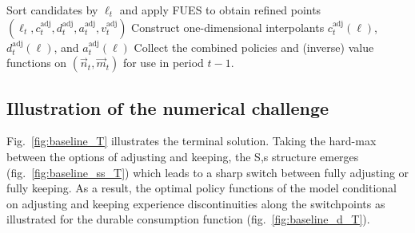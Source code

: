 \begin{algorithm}[htbp]
{{	}
}
Sort candidates by $\ell_t$ and apply FUES to obtain refined points $(\ell_t,c_t^{\mathrm{adj}},d_t^{\mathrm{adj}},a_t^{\mathrm{adj}},v_t^{\mathrm{adj}})$\;
Construct one-dimensional interpolants $c_t^{\mathrm{adj}}(\ell)$, $d_t^{\mathrm{adj}}(\ell)$, and $a_t^{\mathrm{adj}}(\ell)$\;
\BlankLine
{}
Collect the combined policies and (inverse) value functions on $(\vec{n}_t,\vec{m}_t)$ for use in period $t-1$.\;
\end{algorithm}

\subsection{Illustration of the numerical challenge}

Fig.~\ref{fig:baseline_T} illustrates the terminal solution. Taking the hard-max between the options of adjusting and keeping, the S,s structure emerges (fig.~\ref{fig:baseline_ss_T}) which leads to a sharp switch between fully adjusting or fully keeping. As a result, the optimal policy functions of the model conditional on adjusting and keeping experience discontinuities along the switchpoints as illustrated for the durable consumption function (fig.~\ref{fig:baseline_d_T}).

